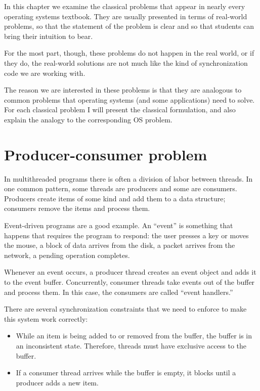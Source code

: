 In this chapter we examine the classical problems that appear
in nearly every operating systems textbook.  They
are usually presented in terms of real-world problems, so
that the statement of the problem is clear and so that students
can bring their intuition to bear.

For the most part, though, these problems do not happen in the
real world, or if they do, the real-world solutions are not much
like the kind of synchronization code we are working with.

The reason we are interested in these problems
is that they are analogous to common problems that operating
systems (and some applications) need to solve.  For each classical
problem I will present the classical formulation, and also explain
the analogy to the corresponding OS problem.


\section{Producer-consumer problem}

In multithreaded programs there is often a division of labor between
threads.  In one common pattern, some threads are producers and some
are consumers.  Producers create items of some kind and add them to a
data structure; consumers remove the items and process them.

Event-driven programs are a good example.  An ``event'' is something
that happens that requires the program to respond: the user presses a
key or moves the mouse, a block of data arrives from the disk, a
packet arrives from the network, a pending operation completes.

Whenever an event occurs, a producer thread creates an event
object and adds it to the event buffer.  Concurrently, consumer
threads take events out of the buffer and process them.
In this case, the consumers are called ``event handlers.''

There are several synchronization constraints that we need to
enforce to make this system work correctly:

\begin{itemize}

\item While an item is being added to or removed from the buffer,
the buffer is in an inconsistent state.  Therefore, threads must
have exclusive access to the buffer.

\item If a consumer thread arrives while the buffer is empty, it
blocks until a producer adds a new item.

\end{itemize}

